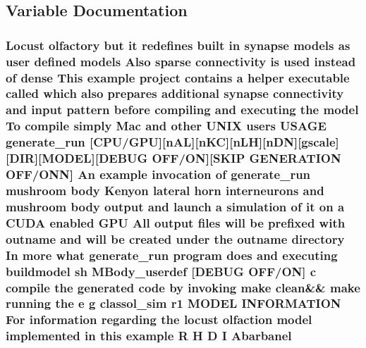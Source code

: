 \subsection{Variable Documentation}
\hypertarget{userproject_2MBody__userdef__project_2README_8txt_a1b81fe698959b27644c90b33bf8e5a04}{
\subsubsection[{Abarbanel}]{\setlength{\rightskip}{0pt plus 5cm}Locust olfactory but {\bf it} redefines built {\bf in} synapse models as user defined models Also sparse connectivity {\bf is} used instead of dense This example {\bf project} contains a helper executable called which also prepares additional synapse connectivity and input pattern before compiling and executing the {\bf model} To compile simply Mac and other U\+N\+I\+X users U\+S\+A\+G\+E {\bf generate\+\_\+run} \mbox{[}{\bf C\+P\+U}/{\bf G\+P\+U}\mbox{]}\mbox{[}n\+A\+L\mbox{]}\mbox{[}n\+K\+C\mbox{]}\mbox{[}n\+L\+H\mbox{]}\mbox{[}n\+D\+N\mbox{]}\mbox{[}gscale\mbox{]}\mbox{[}D\+I\+R\mbox{]}\mbox{[}M\+O\+D\+E\+L\mbox{]}\mbox{[}D\+E\+B\+U\+G O\+F\+F/O\+N\mbox{]}\mbox{[}S\+K\+I\+P G\+E\+N\+E\+R\+A\+T\+I\+O\+N O\+F\+F/O\+N\+N\mbox{]} An example invocation of {\bf generate\+\_\+run} mushroom body Kenyon lateral horn {\bf interneurons} and mushroom body output and launch a simulation of {\bf it} on a C\+U\+D\+A enabled {\bf G\+P\+U} All output files will be prefixed {\bf with} outname and will be created under the outname {\bf directory} In more what {\bf generate\+\_\+run} program does and executing buildmodel sh M\+Body\+\_\+userdef \mbox{[}D\+E\+B\+U\+G O\+F\+F/O\+N\mbox{]} c compile the generated {\bf code} by invoking make clean\&\& make running the e g classol\+\_\+sim r1 M\+O\+D\+E\+L I\+N\+F\+O\+R\+M\+A\+T\+I\+O\+N For information regarding the locust olfaction {\bf model} implemented {\bf in} this example {\bf R} H D I Abarbanel}}\label{userproject_2MBody__userdef__project_2README_8txt_a1b81fe698959b27644c90b33bf8e5a04}
